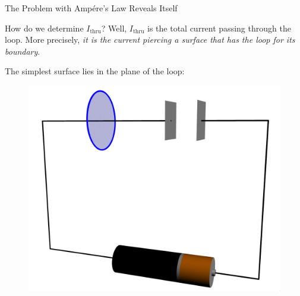 \documentclass{beamer}
\begin{document}
\begin{frame}{The Problem with Amp{\'e}re's Law Reveals Itself}

How do we determine $I_{\text{thru}}$? Well, $I_{\text{thru}}$ is the total current passing through the loop. More precisely, \emph{it is the current piercing a surface that has the loop for its boundary}.

\vfill

The simplest surface lies in the plane of the loop:

\begin{figure}[H]
\centering
\includegraphics[width=0.5\textheight]{figures/duracell_disk.png}
\end{figure}

\end{frame}
\end{document}
